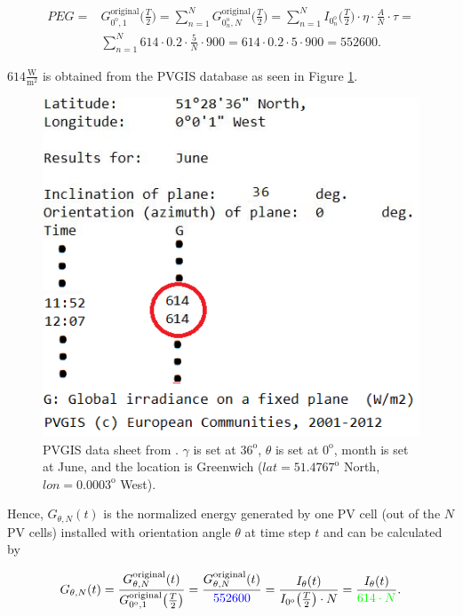 \begin{align}
PEG = & G^{\text{original}}_{0^{\mathrm{o}},1}\big(\frac{T}{2}\big)= \sum_{n=1}^N G^{\text{original}}_{0_n^{\mathrm{o}},N}\big(\frac{T}{2}\big)= \sum_{n=1}^N I_{0_n^{\mathrm{o}}}\big(\frac{T}{2}\big)\cdot \eta \cdot \frac{A}{N} \cdot \tau=\\
&\sum_{n=1}^N 614 \cdot 0.2 \cdot \frac{5}{N}  \cdot 900 = 614 \cdot 0.2 \cdot 5  \cdot 900 =552600.
\end{align}

$614 \frac{\mathrm{W}}{\mathrm{m^2}}$ is obtained from the PVGIS database as seen in Figure \ref{normal2}. 

\begin{figure}[H]
	\centering
		\includegraphics[width=0.5\columnwidth]{pictures/normal2}
\caption{PVGIS data sheet from \cite{PVGIS}. $\gamma$ is set at $36^{\mathrm{o}}$, $\theta$ is set at $0^{\mathrm{o}}$, month is set at June, and the location is Greenwich ($lat=51.4767^{\mathrm{o}}$ North, $lon=0.0003^{\mathrm{o}}$ West).\label{normal2}}
\end{figure}

Hence, $G_{\theta,N}(t)$ is the normalized energy generated by one PV cell (out of the $N$ PV cells) installed with orientation angle $\theta$ at time step $t$ and can be calculated by

\begin{equation}\label{eins}
G_{\theta,N}(t)=\frac{G_{\theta,N}^{\text{original}}(t)}{G^{\text{original}}_{0^{\mathrm{o}},1}\big(\frac{T}{2}\big)}=\frac{G_{\theta,N}^{\text{original}}(t)}{\textcolor{blue}{552600}}=\frac{I_{\theta}(t)}{I_{0^{\mathrm{o}}}\big(\frac{T}{2}\big)\cdot N}= \frac{I_{\theta}(t)}{\textcolor{green}{614\cdot N}}.
\end{equation}




